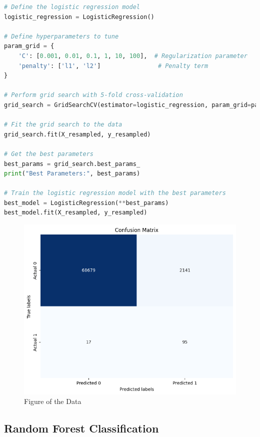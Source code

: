 \begin{lstlisting}[language=Python, caption={Code snippet in \LaTeX ~and  this is a Python code example}, label=list:python_code_ex]
# Define the logistic regression model
logistic_regression = LogisticRegression()

# Define hyperparameters to tune
param_grid = {
    'C': [0.001, 0.01, 0.1, 1, 10, 100],  # Regularization parameter
    'penalty': ['l1', 'l2']                # Penalty term
}

# Perform grid search with 5-fold cross-validation
grid_search = GridSearchCV(estimator=logistic_regression, param_grid=param_grid, cv=5, scoring='f1_macro', verbose=1)

# Fit the grid search to the data
grid_search.fit(X_resampled, y_resampled)

# Get the best parameters
best_params = grid_search.best_params_
print("Best Parameters:", best_params)

# Train the logistic regression model with the best parameters
best_model = LogisticRegression(**best_params)
best_model.fit(X_resampled, y_resampled)
\end{lstlisting}

\begin{figure}[ht]
    \centering
    \includegraphics[scale=0.9]{figures/CM_GridSearch.png}
    \caption{Figure of the Data}
    \label{fig:Plot of the Data}
\end{figure}

\clearpage


\subsection{Random Forest Classification}

